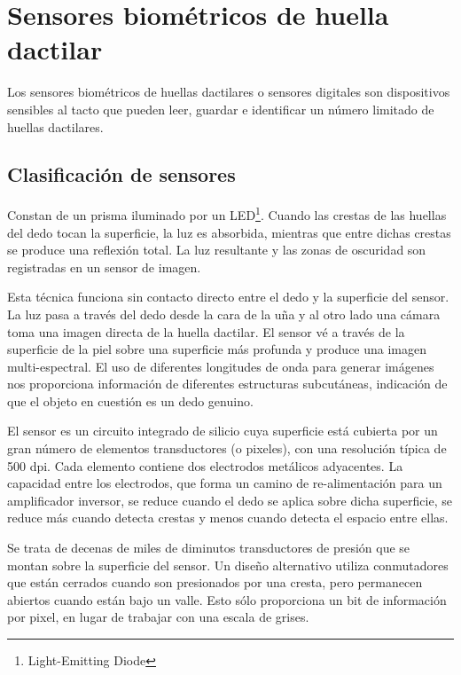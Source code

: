 \documentclass[../principal]{subfiles}
\begin{document}
  \section{Sensores biométricos de huella dactilar}

  Los sensores biométricos de huellas dactilares o sensores digitales son dispositivos sensibles al tacto que pueden leer, guardar e identificar un número limitado de huellas dactilares.

  \subsection{Clasificación de sensores}

  \begin{description}[align=left]
    \item[Ópticos reflexivos:] Constan de un prisma iluminado por un LED\footnote{Light-Emitting Diode}. Cuando las crestas de las huellas del dedo tocan la superficie, la luz es absorbida, mientras que entre dichas crestas se produce una reflexión total. La luz resultante y las zonas de oscuridad son registradas en un sensor de imagen.\cite{web:sensor_huella_digital}
    \item[Ópticos transmisivos:] Esta técnica funciona sin contacto directo entre el dedo y la superficie del sensor. La luz pasa a través del dedo desde la cara de la uña y al otro lado una cámara toma una imagen directa de la huella dactilar. El sensor vé a través de la superficie de la piel sobre una superficie más profunda y produce una imagen multi-espectral. El uso de diferentes longitudes de onda para generar imágenes nos proporciona información de diferentes estructuras subcutáneas, indicación de que el objeto en cuestión es un dedo genuino.\cite{web:sensor_huella_digital}
    \item[Capacitivos:] El sensor es un circuito integrado de silicio cuya superficie está cubierta por un gran número de elementos transductores (o pixeles), con una resolución típica de 500 dpi. Cada elemento contiene dos electrodos metálicos adyacentes. La capacidad entre los electrodos, que forma un camino de re-alimentación para un amplificador inversor, se reduce cuando el dedo se aplica sobre dicha superficie, se reduce más cuando detecta crestas y menos cuando detecta el espacio entre ellas.\cite{web:sensor_huella_digital}
    \item[Mecánicos:] Se trata de decenas de miles de diminutos transductores de presión que se montan sobre la superficie del sensor. Un diseño alternativo utiliza conmutadores que están cerrados cuando son presionados por una cresta, pero permanecen abiertos cuando están bajo un valle. Esto sólo proporciona un bit de información por pixel, en lugar de trabajar con una escala de grises.\cite{web:sensor_huella_digital}

\end{description}
\end{document}
